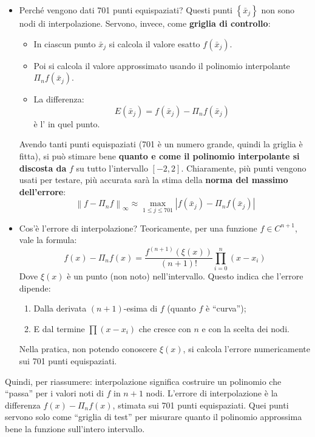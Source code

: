 \begin{remarkbox}
\begin{itemize}
        
        \item Perché vengono dati 701 punti equispaziati? Questi punti $\left\{\bar{x}_{j}\right\}$ non sono nodi di interpolazione. Servono, invece, come \textbf{griglia di controllo}:
        \begin{itemize}
            \item In ciascun punto $\bar{x}_{j}$ si calcola il valore esatto $f\left(\bar{x}_{j}\right)$.
            \item Poi si calcola il valore approssimato usando il polinomio interpolante $\Pi_{n} f\left(\bar{x}_{j}\right)$.
            \item La differenza:
            \begin{equation*}
                E\left(\bar{x}_{j}\right) = f\left(\bar{x}_{j}\right) - \Pi_{n} f\left(\bar{x}_{j}\right)
            \end{equation*}
            è l' in quel punto.
        \end{itemize}
        Avendo tanti punti equispaziati (701 è un numero grande, quindi la griglia è fitta), si può stimare bene \textbf{quanto e come il polinomio interpolante si discosta da} $f$ su tutto l'intervallo $\left[-2, 2\right]$. Chiaramente, più punti vengono usati per testare, più accurata sarà la stima della \textbf{norma del massimo dell'errore}:
        \begin{equation*}
            \left\| f - \Pi_{n} f \right\|_{\infty} \approx \max_{1\le j \le 701} \left| f\left(\bar{x}_j\right) - \Pi_{n} f\left(\bar{x}_j\right) \right|
        \end{equation*}


        \item Cos'è l'errore di interpolazione? Teoricamente, per una funzione $f \in C^{n+1}$, vale la formula:
        \begin{equation*}
            f(x) - \Pi_{n} f(x) = \dfrac{f^{(n+1)}(\xi(x))}{(n+1)!} \displaystyle\prod_{i=0}^{n}(x - x_i)
        \end{equation*}
        Dove $\xi(x)$ è un punto (non noto) nell'intervallo. Questo indica che l'errore dipende:
        \begin{enumerate}
            \item Dalla derivata $(n+1)$-esima di $f$ (quanto $f$ è ``curva'');
            \item E dal termine $\displaystyle\prod (x - x_{i})$ che cresce con $n$ e con la scelta dei nodi.
        \end{enumerate}
        Nella pratica, non potendo conoscere $\xi(x)$, si calcola l'errore numericamente sui 701 punti equispaziati.
    \end{itemize}
    Quindi, per riassumere: interpolazione significa costruire un polinomio che ``passa'' per i valori noti di $f$ in $n+1$ nodi. L'errore di interpolazione è la differenza $f(x) - \Pi_{n} f(x)$, stimata sui 701 punti equispaziati. Quei punti servono solo come ``griglia di test'' per misurare quanto il polinomio approssima bene la funzione sull'intero intervallo.
\end{remarkbox}

